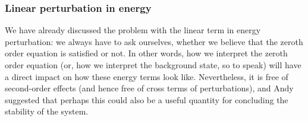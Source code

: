 \subsubsection{Linear perturbation in energy}

We have already discussed the problem with the linear term in energy perturbation: we always have to ask ourselves, whether we believe that the zeroth order equation is satisfied or not. In other words, how we interpret the zeroth order equation (or, how we interpret the background state, so to speak) will have a direct impact on how these energy terms look like. Nevertheless, it is free of second-order effects (and hence free of cross terms of perturbations), and Andy suggested that perhaps this could also be a useful quantity for concluding the stability of the system.

